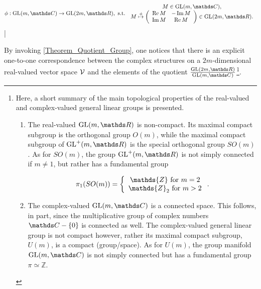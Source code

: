 \begin{equation}
    \begin{split}
    \phi: \generallineargroup(m,\C) \rightarrow \generallineargroup(2m,\R), \textnormal{ s.t. }
    \begin{array}{cc}
         M \in \generallineargroup(m,\C), \\
         M \overset{\phi}{ \mapsto} 
        \left(
            \begin{array}{cc}
                \Re M & -\Im M  \\
                \Im M & \Re M
            \end{array}
        \right) \in \generallineargroup(2m, \R).
    \end{array}
    \end{split}
\end{equation}|

By invoking \cref{Theorem_Quotient_Group}, one notices that there is an 
explicit one-to-one correspondence between the complex structures 
on a  $2m$-dimensional real-valued vector space $\mathcal{V}$ and the elements of the quotient
$\frac{\generallineargroup(2m, \R)}{\generallineargroup(m, 
\C)}$\footnote{Here, a short summary of the main topological properties of the real-valued and complex-valued general linear groups is presented.

\begin{enumerate}
    \item The real-valued $\generallineargroup(m, \R)$ is non-compact. Its maximal compact subgroup is the orthogonal group $O(m)$, while the maximal compact subgroup of $\generallineargroup^+(m, \R)$ is the special orthogonal group $SO(m)$. As for $SO(m)$, the group  $\generallineargroup^+(m, \R)$ is not simply connected if $m \neq 1$, but rather has a fundamental group
        
        \begin{equation*}
            \pi_1(SO(m)) = \left\{ \begin{array}{cc}
                 \mathds{Z} \textnormal{ for } m = 2 \\
                \mathds{Z}_2 \textnormal{ for } m > 2 
            \end{array}
            \right..
        \end{equation*}
    
    \item The complex-valued $\generallineargroup(m, \C)$ is a connected space. This follows, in part, since the multiplicative group of complex numbers $\C - \{0\}$ is connected as well. The complex-valued general linear group is not compact however, rather its maximal compact subgroup, $U(m)$, is a compact (group/space). As for $U(m)$, the group manifold $\generallineargroup(m, \C)$ is not simply connected but has a fundamental group $\pi \simeq \mathds{Z}$.
\end{enumerate}
}. \medbreak


